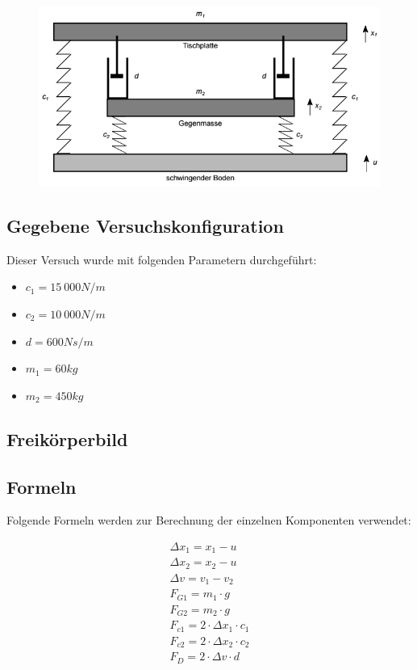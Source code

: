 \documentclass[]{scrartcl}
\begin{document}
\begin{figure}[H]
\centering
\includegraphics[width=0.5\linewidth]{./4_Versuchsaufbau}
\caption{}
\label{fig:4_Versuchsaufbau}
\end{figure}

\subsection{Gegebene Versuchskonfiguration}
Dieser Versuch wurde mit folgenden Parametern durchgeführt:
\begin{itemize}
\item $c_{1} = 15\ 000 N/m$
\item $c_{2} = 10\ 000 N/m$
\item $d = 600 Ns/m$
\item $m_{1} = 60 kg$
\item $m_{2} = 450 kg$
\end{itemize}

\subsection{Freikörperbild}

\subsection{Formeln}
Folgende Formeln werden zur Berechnung der einzelnen Komponenten verwendet:

\begin{align}
\Delta x_{1} = x_{1} - u\\
\Delta x_{2} = x_{2} - u\\
\Delta v = v_{1} - v_{2}\\
F_{G1} = m_{1} \cdot g\\
F_{G2} = m_{2} \cdot g\\
F_{c1} = 2 \cdot \Delta x_{1} \cdot c_{1}\\
F_{c2} = 2 \cdot \Delta x_{2} \cdot c_{2}\\
F_{D} = 2 \cdot \Delta v \cdot d
\end{align}
\end{document}
